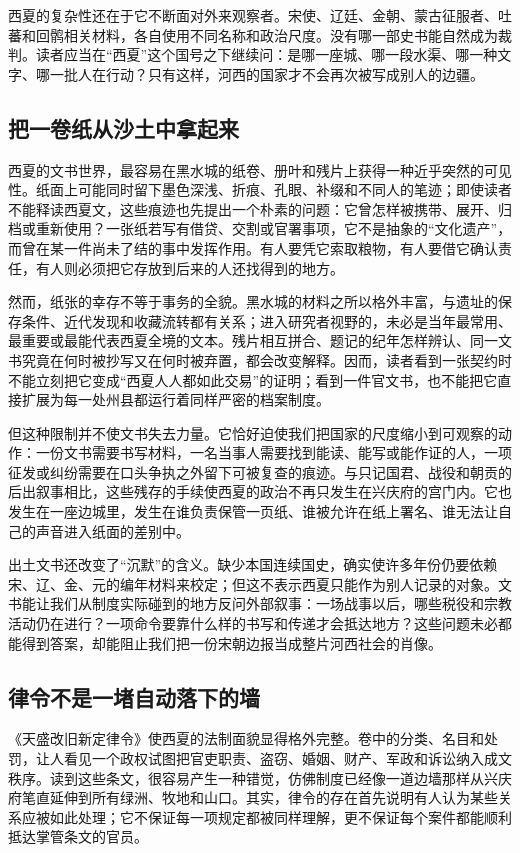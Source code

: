 西夏的复杂性还在于它不断面对外来观察者。宋使、辽廷、金朝、蒙古征服者、吐蕃和回鹘相关材料，各自使用不同名称和政治尺度。没有哪一部史书能自然成为裁判。读者应当在“西夏”这个国号之下继续问：是哪一座城、哪一段水渠、哪一种文字、哪一批人在行动？只有这样，河西的国家才不会再次被写成别人的边疆。

\subsection{把一卷纸从沙土中拿起来}

西夏的文书世界，最容易在黑水城的纸卷、册叶和残片上获得一种近乎突然的可见性。纸面上可能同时留下墨色深浅、折痕、孔眼、补缀和不同人的笔迹；即使读者不能释读西夏文，这些痕迹也先提出一个朴素的问题：它曾怎样被携带、展开、归档或重新使用？一张纸若写有借贷、交割或官署事项，它不是抽象的“文化遗产”，而曾在某一件尚未了结的事中发挥作用。有人要凭它索取粮物，有人要借它确认责任，有人则必须把它存放到后来的人还找得到的地方。

然而，纸张的幸存不等于事务的全貌。黑水城的材料之所以格外丰富，与遗址的保存条件、近代发现和收藏流转都有关系；进入研究者视野的，未必是当年最常用、最重要或最能代表西夏全境的文本。残片相互拼合、题记的纪年怎样辨认、同一文书究竟在何时被抄写又在何时被弃置，都会改变解释。因而，读者看到一张契约时不能立刻把它变成“西夏人人都如此交易”的证明；看到一件官文书，也不能把它直接扩展为每一处州县都运行着同样严密的档案制度。

但这种限制并不使文书失去力量。它恰好迫使我们把国家的尺度缩小到可观察的动作：一份文书需要书写材料，一名当事人需要找到能读、能写或能作证的人，一项征发或纠纷需要在口头争执之外留下可被复查的痕迹。与只记国君、战役和朝贡的后出叙事相比，这些残存的手续使西夏的政治不再只发生在兴庆府的宫门内。它也发生在一座边城里，发生在谁负责保管一页纸、谁被允许在纸上署名、谁无法让自己的声音进入纸面的差别中。

出土文书还改变了“沉默”的含义。缺少本国连续国史，确实使许多年份仍要依赖宋、辽、金、元的编年材料来校定；但这不表示西夏只能作为别人记录的对象。文书能让我们从制度实际碰到的地方反问外部叙事：一场战事以后，哪些税役和宗教活动仍在进行？一项命令要靠什么样的书写和传递才会抵达地方？这些问题未必都能得到答案，却能阻止我们把一份宋朝边报当成整片河西社会的肖像。

\subsection{律令不是一堵自动落下的墙}

《天盛改旧新定律令》使西夏的法制面貌显得格外完整。卷中的分类、名目和处罚，让人看见一个政权试图把官吏职责、盗窃、婚姻、财产、军政和诉讼纳入成文秩序。读到这些条文，很容易产生一种错觉，仿佛制度已经像一道边墙那样从兴庆府笔直延伸到所有绿洲、牧地和山口。其实，律令的存在首先说明有人认为某些关系应被如此处理；它不保证每一项规定都被同样理解，更不保证每个案件都能顺利抵达掌管条文的官员。

